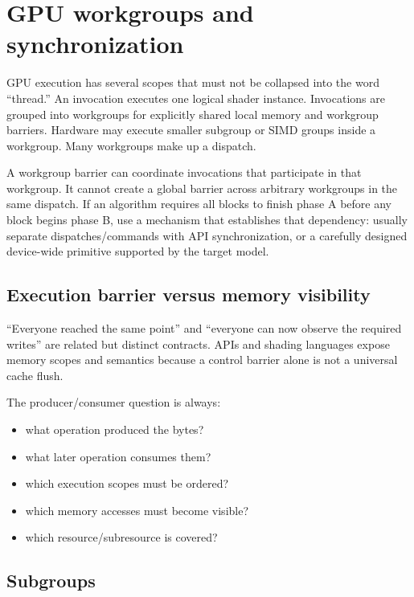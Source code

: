 \hypertarget{appendix-f662b5b1773b}{}\label{referencestart:appendix-f662b5b1773b}
\section{GPU workgroups and synchronization}\label{appendix-f662b5b1773b-gpu-workgroups-and-synchronization}

GPU execution has several scopes that must not be collapsed into the word ``thread.'' An invocation executes one logical shader instance. Invocations are grouped into workgroups for explicitly shared local memory and workgroup barriers. Hardware may execute smaller subgroup or SIMD groups inside a workgroup. Many workgroups make up a dispatch.

A workgroup barrier can coordinate invocations that participate in that workgroup. It cannot create a global barrier across arbitrary workgroups in the same dispatch. If an algorithm requires all blocks to finish phase A before any block begins phase B, use a mechanism that establishes that dependency: usually separate dispatches/commands with API synchronization, or a carefully designed device-wide primitive supported by the target model.

\subsection{Execution barrier versus memory visibility}\label{appendix-f662b5b1773b-execution-barrier-versus-memory-visibility}

``Everyone reached the same point'' and ``everyone can now observe the required writes'' are related but distinct contracts. APIs and shading languages expose memory scopes and semantics because a control barrier alone is not a universal cache flush.

The producer/consumer question is always:

\begin{itemize}
\tightlist
\item
  what operation produced the bytes?
\item
  what later operation consumes them?
\item
  which execution scopes must be ordered?
\item
  which memory accesses must become visible?
\item
  which resource/subresource is covered?
\end{itemize}

\subsection{Subgroups}\label{appendix-f662b5b1773b-subgroups}

